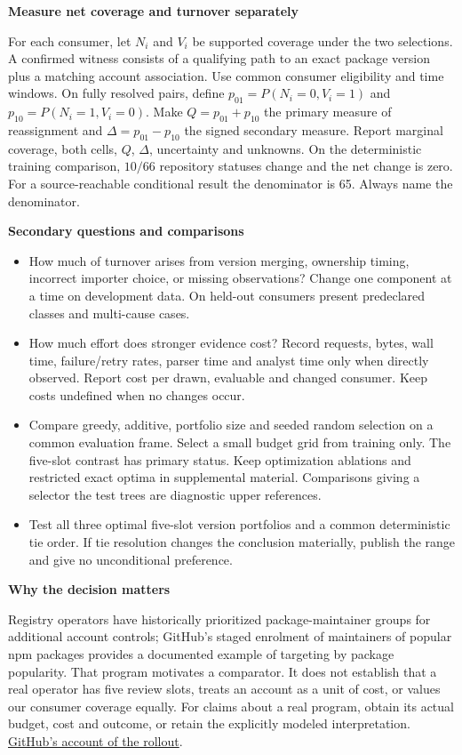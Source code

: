 \documentclass[11pt,a4paper]{article}
\newcommand{\hd}[1]{\par\textbf{\color{accent}#1}\par\nopagebreak}
\begin{document}
\hd{Measure net coverage and turnover separately}
For each consumer, let $N_i$ and $V_i$ be supported coverage under the two selections. A confirmed witness consists of a qualifying path to an exact package version plus a matching account association. Use common consumer eligibility and time windows. On fully resolved pairs, define $p_{01}=P(N_i=0,V_i=1)$ and $p_{10}=P(N_i=1,V_i=0)$. Make $Q=p_{01}+p_{10}$ the primary measure of reassignment and $\Delta=p_{01}-p_{10}$ the signed secondary measure. Report marginal coverage, both cells, $Q$, $\Delta$, uncertainty and unknowns. On the deterministic training comparison, $10/66$ repository statuses change and the net change is zero. For a source-reachable conditional result the denominator is 65. Always name the denominator.

\hd{Secondary questions and comparisons}
\begin{itemize}
\item How much of turnover arises from version merging, ownership timing, incorrect importer choice, or missing observations? Change one component at a time on development data. On held-out consumers present predeclared classes and multi-cause cases.
\item How much effort does stronger evidence cost? Record requests, bytes, wall time, failure/retry rates, parser time and analyst time only when directly observed. Report cost per drawn, evaluable and changed consumer. Keep costs undefined when no changes occur.
\item Compare greedy, additive, portfolio size and seeded random selection on a common evaluation frame. Select a small budget grid from training only. The five-slot contrast has primary status. Keep optimization ablations and restricted exact optima in supplemental material. Comparisons giving a selector the test trees are diagnostic upper references.
\item Test all three optimal five-slot version portfolios and a common deterministic tie order. If tie resolution changes the conclusion materially, publish the range and give no unconditional preference.
\end{itemize}
\hd{Why the decision matters}
Registry operators have historically prioritized package-maintainer groups for additional account controls; GitHub's staged enrolment of maintainers of popular npm packages provides a documented example of targeting by package popularity. That program motivates a comparator. It does not establish that a real operator has five review slots, treats an account as a unit of cost, or values our consumer coverage equally. For claims about a real program, obtain its actual budget, cost and outcome, or retain the explicitly modeled interpretation. \href{https://github.blog/security/supply-chain-security/top-100-npm-package-maintainers-require-2fa-additional-security/}{GitHub's account of the rollout}.
\end{document}
